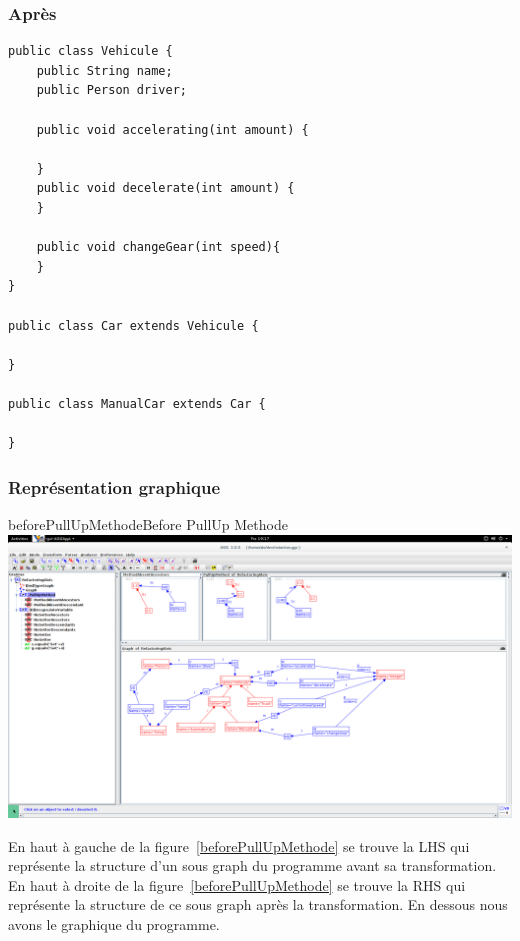 \documentclass[a4paper, 12pt]{article}
\begin{document}
\subsubsection{Après}
\begin{lstlisting}[frame=single]
public class Vehicule {
	public String name;
	public Person driver;

	public void accelerating(int amount) {

	}
	public void decelerate(int amount) { 
	}
	
	public void changeGear(int speed){
	}
}

public class Car extends Vehicule {

}

public class ManualCar extends Car {

}
\end{lstlisting}

\subsubsection{Représentation graphique}

\begin{myfig}{beforePullUpMethode}{Before PullUp Methode}
\includegraphics[width=\textwidth]{beforePullUpMethode.png}
\end{myfig}

En haut à gauche de la figure~\ref{beforePullUpMethode} se trouve la LHS qui représente la structure d'un sous graph du programme avant sa transformation. 
En haut à droite de la figure~\ref{beforePullUpMethode} se trouve la RHS qui représente la structure de ce sous graph après la transformation.
En dessous nous avons le graphique du programme.
\end{document}
